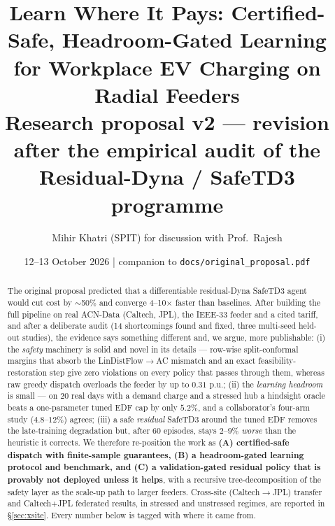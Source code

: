 \documentclass[10pt,a4paper]{article}
\title{\textbf{Learn Where It Pays: Certified-Safe, Headroom-Gated Learning\\for Workplace EV Charging on Radial Feeders}\\[2pt]
\large Research proposal v2 --- revision after the empirical audit of the Residual-Dyna / SafeTD3 programme}
\author{Mihir Khatri \;(SPIT) \quad for discussion with Prof.\ Rajesh}
\date{12--13 October 2026 \;|\; companion to \texttt{docs/original\_proposal.pdf}}
\begin{document}
\maketitle

\begin{abstract}
\noindent The original proposal predicted that a differentiable residual-Dyna SafeTD3 agent would cut cost by
$\sim$50\% and converge 4--10$\times$ faster than baselines. After building the full pipeline on real ACN-Data
(Caltech, JPL), the IEEE-33 feeder and a cited tariff, and after a deliberate audit (14 shortcomings found and
fixed, three multi-seed held-out studies), the evidence says something different and, we argue, more publishable:
(i) the \emph{safety} machinery is solid and novel in its details --- row-wise split-conformal margins that absorb
the LinDistFlow$\to$AC mismatch and an exact feasibility-restoration step give zero violations on every
policy that passes through them, whereas raw greedy dispatch overloads the feeder by up to $0.31$ p.u.;
(ii) the \emph{learning headroom} is small --- on 20 real days with a demand charge and a stressed hub a
hindsight oracle beats a one-parameter tuned EDF cap by only $5.2\%$, and a collaborator's four-arm study
($4.8$--$12\%$) agrees; (iii) a safe \emph{residual} SafeTD3 around the tuned EDF removes the late-training
degradation but, after 60 episodes, stays $2$--$9\%$ \emph{worse} than the heuristic it corrects. We therefore
re-position the work as \textbf{(A) certified-safe dispatch with finite-sample guarantees, (B) a
headroom-gated learning protocol and benchmark, and (C) a validation-gated residual policy that is provably not
deployed unless it helps}, with a recursive tree-decomposition of the safety layer as the scale-up path to larger
feeders. Cross-site (Caltech$\to$JPL) transfer and Caltech+JPL federated results, in stressed and unstressed regimes,
are reported in \S\ref{sec:xsite}. Every number below is tagged with where it came from.
\end{abstract}
\end{document}
